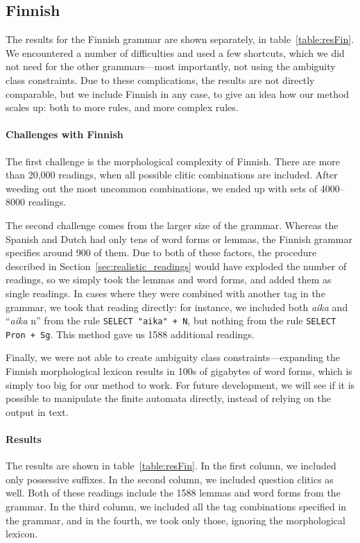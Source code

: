 \subsection{Finnish} 

The results for the Finnish grammar are shown separately, in table~\ref{table:resFin}. We encountered a number of difficulties and used a few shortcuts, which we did not need for the other grammars---most importantly, not using the ambiguity class constraints. Due to these complications, the results are not directly comparable, but we include Finnish in any case, 
to give an idea how our method scales up: both to more rules, and more complex rules.

\paragraph{Challenges with Finnish} The first challenge is the morphological complexity of Finnish.
There are more than 20,000 readings, when all possible clitic combinations are included.
After weeding out the most uncommon combinations, we ended up with sets of 4000--8000 readings.

The second challenge comes from the larger size of the grammar. Whereas the Spanish and Dutch had only tens of word forms or lemmas, the Finnish grammar specifies around 900 of them.
Due to both of these factors, the procedure described in Section~\ref{sec:realistic_readings} would have exploded the number of readings, so we simply took the lemmas and word forms, and added them as single readings. 
In cases where they were combined with another tag in the grammar, we took that reading directly: for instance, we included both \emph{aika} and ``\emph{aika} n'' from the rule \texttt{SELECT "aika" + N},
but nothing from the rule \texttt{SELECT Pron + Sg}. This method gave us 1588 additional readings.

Finally, we were not able to create ambiguity class constraints---expanding the Finnish morphological lexicon results in 100s of gigabytes of word forms, which is simply too big for our method to work. 
For future development, we will see if it is possible to manipulate the finite automata directly, instead of relying on the output in text.


\paragraph{Results}
The results are shown in table~\ref{table:resFin}.
In the first column, we included only possessive suffixes. In the second column, we included question clitics as well.
Both of these readings include the 1588 lemmas and word forms from the grammar.
In the third column, we included all the tag combinations specified in the grammar, and in the fourth, we took only those, ignoring the morphological lexicon.

